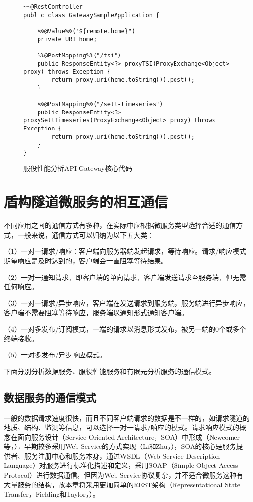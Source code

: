 \begin{figure}[htb!]
\centering
\begin{minipage}[t]{1.0\linewidth}
\begin{lstlisting}
~~@RestController
public class GatewaySampleApplication {

	%%@Value%%("${remote.home}")
	private URI home;

	%%@PostMapping%%("/tsi")
	public ResponseEntity<?> proxyTSI(ProxyExchange<Object> proxy) throws Exception {
		return proxy.uri(home.toString()).post();
	}

	%%@PostMapping%%("/sett-timeseries")
	public ResponseEntity<?> proxySettTimeseries(ProxyExchange<Object> proxy) throws Exception {
		return proxy.uri(home.toString()).post();
	}
}
\end{lstlisting}
\end{minipage} 
\caption{服役性能分析API Gateway核心代码}
\label{fig:服役性能分析APIGateway核心代码}
\end{figure}

\section{盾构隧道微服务的相互通信}

不同应用之间的通信方式有多种，在实际中应根据微服务类型选择合适的通信方式，一般来说，通信方式可以归纳为以下五大类：

（1）一对一请求/响应：客户端向服务器端发起请求，等待响应。请求/响应模式期望响应是及时达到的，客户端会一直阻塞等待结果。

（2）一对一通知请求，即客户端的单向请求，客户端发送请求至服务端，但无需任何响应。

（3）一对一请求/异步响应，客户端在发送请求到服务端，服务端进行异步响应，客户端不需要阻塞等待响应，服务端以通知形式通知客户端。

（4）一对多发布/订阅模式，一端的请求以消息形式发布，被另一端的0个或多个终端接收。

（5）一对多发布/异步响应模式。

下面分别分析数据服务、服役性能服务和有限元分析服务的通信模式。

\subsection{数据服务的通信模式}

一般的数据请求速度很快，而且不同客户端请求的数据是不一样的，如请求隧道的地质、结构、监测等信息，可以选择一对一请求/响应的模式。请求响应模式的概念在面向服务设计（Service-Oriented Architecture，SOA）中形成（Newcomer等，\citeyear{newcomer2005understanding}），早期较多采用Web Service的方式实现（Li和Zhu，\citeyear{li2013development}），SOA的核心是服务提供者、服务注册中心和服务本身，通过WSDL（Web Service Description Language）对服务进行标准化描述和定义，采用SOAP（Simple Object Access Protocol）进行数据通信。但因为Web Service协议复杂，并不适合微服务这种有大量服务的结构，故本章将采用更加简单的REST架构（Representational State Transfer，Fielding和Taylor，\citeyear{fielding2000architectural}）。

